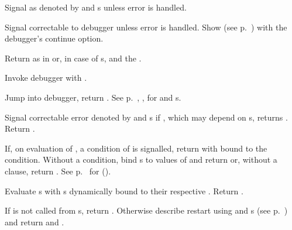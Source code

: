 \begin{LIST}{1cm}
  {
  Signal  as denoted by  and s unless
  error is handled. 
  }

  {
  Signal correctable  to debugger unless error is
  handled. Show   (see
  p.\ \pageref{section:Format}) with the debugger's continue option.
  }

  {
  Return  as in  or, in case of s,
  \retval{\NIL} and the .
  }

  {
  Invoke debugger with .
  }

  {
  Jump into debugger, return \retval{\NIL}.
  See p.\ \pageref{section:Format}, , for 
  and s. 
  }

  {
  Signal correctable error denoted by  and s if
  , which may depend on s, returns \NIL. Return
  \retval{\NIL}. 
  }

  {
  If, on evaluation of , a condition of  is
  signalled, return 
  with  bound to the condition. Without a condition, bind
  s to values of  and return  or, without a  clause, return
  . See p.\ \pageref{section:Functions}
  for ().
  }

  {
  Evaluate s with s dynamically bound to
  their respective . Return .
  }

  {
  If  is not called from s, return
  . Otherwise describe restart using
    and s (see
  p.\ \pageref{section:Format}) and return \retval{\NIL}
  and \retvalii{\T}.
  }


\end{LIST}
